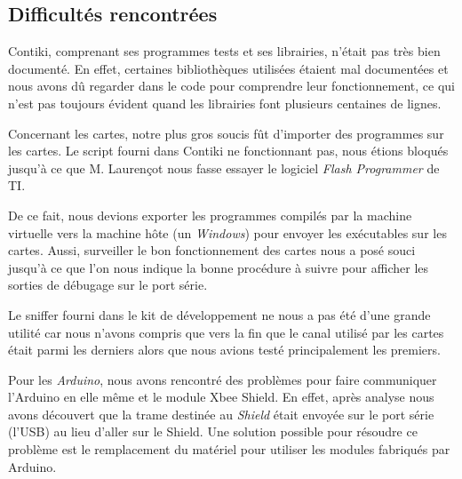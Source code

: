 
\subsection{Difficultés rencontrées}

Contiki, comprenant ses programmes tests et ses librairies, n'était pas très bien documenté.
En effet, certaines bibliothèques utilisées étaient mal documentées et nous avons dû regarder dans le code pour comprendre leur fonctionnement, ce qui n'est pas toujours évident quand les librairies font plusieurs centaines de lignes.


Concernant les cartes, notre plus gros soucis fût d'importer des programmes sur les cartes.
Le script fourni dans Contiki ne fonctionnant pas, nous étions bloqués jusqu'à ce que M. Laurençot nous fasse essayer le logiciel \emph{Flash Programmer} de TI.

De ce fait, nous devions exporter les programmes compilés par la machine virtuelle vers la machine hôte (un \emph{Windows}) pour envoyer les exécutables sur les cartes.
Aussi, surveiller le bon fonctionnement des cartes nous a posé souci jusqu'à ce que l'on nous indique la bonne procédure à suivre pour afficher les sorties de débugage sur le port série.


Le sniffer fourni dans le kit de développement ne nous a pas été d'une grande utilité car nous n'avons compris que vers la fin que le canal utilisé par les cartes était parmi les derniers alors que nous avions testé principalement les premiers.  


Pour les \emph{Arduino}, nous avons rencontré des problèmes pour faire communiquer l'Arduino en elle même et le module Xbee Shield. 
En effet, après analyse nous avons découvert que la trame destinée au \emph{Shield} était envoyée sur le port série (l'USB) au lieu d'aller sur le Shield.
Une solution possible pour résoudre ce problème est le remplacement du matériel pour utiliser les modules fabriqués par Arduino.

